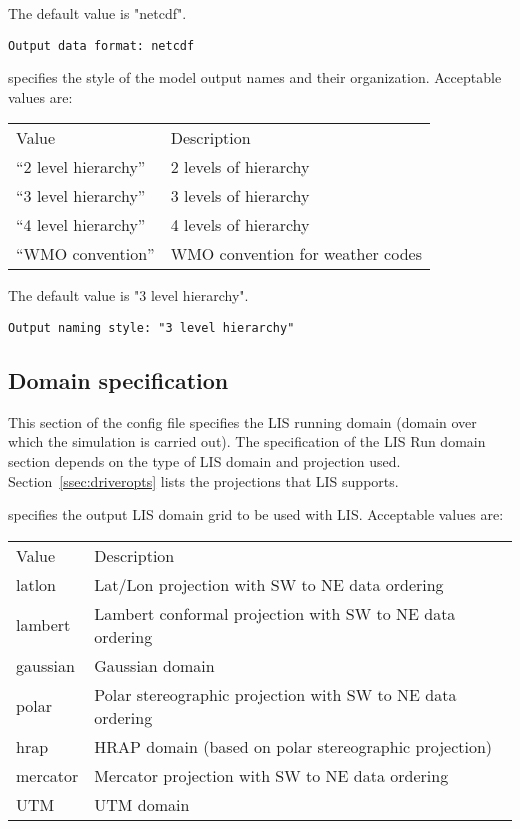  The default value is "netcdf".
 

 \begin{Verbatim}[frame=single]
Output data format: netcdf
 \end{Verbatim}

 
  specifies the style of the model output
 names and their organization.
 Acceptable values are:

 \begin{tabular}{ll}
 Value                 & Description                       \\
 ``2 level hierarchy'' & 2 levels of hierarchy             \\
 ``3 level hierarchy'' & 3 levels of hierarchy             \\
 ``4 level hierarchy'' & 4 levels of hierarchy             \\
 ``WMO convention''    & WMO convention for weather codes  \\
 \end{tabular}

 The default value is "3 level hierarchy".
 

 \begin{Verbatim}[frame=single]
Output naming style: "3 level hierarchy"
 \end{Verbatim}

 
 \subsection{Domain specification} \label{ssec:domainspec}
 This section of the config file specifies the LIS running domain
 (domain over which the simulation is carried out).
 The specification of the LIS Run domain section depends on the type of
 LIS domain and projection used.
 Section~\ref{ssec:driveropts} lists the projections that LIS supports.
 

 
  specifies the output 
 LIS domain grid to be used with LIS.
 Acceptable values are:

 \begin{tabular}{ll}
 Value    & Description                                              \\
 latlon   & Lat/Lon projection with SW to NE data ordering           \\
 lambert  & Lambert conformal projection with SW to NE data ordering \\
 gaussian & Gaussian domain                                          \\
 polar    & Polar stereographic projection with SW to NE data
            ordering                                                 \\
 hrap     & HRAP domain (based on polar stereographic projection)    \\
 mercator & Mercator projection with SW to NE data ordering          \\
 
 UTM      & UTM domain                                               \\
 
 \end{tabular}
 

